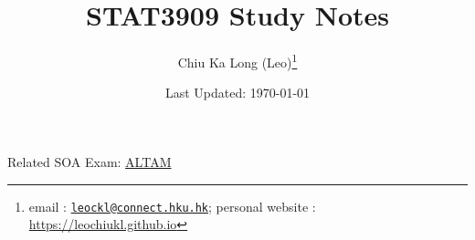 \documentclass{article}
\begin{document}
\title{STAT3909 Study Notes}
\author{Chiu Ka Long (Leo)\thanks{
email :
\href{mailto:leockl@connect.hku.hk}{\texttt{leockl@connect.hku.hk}};
personal website :
\url{https://leochiukl.github.io}
}}
\date{Last Updated: \today}
\maketitle
\doclicenseThis
\begin{note}
Related SOA Exam:
\href{https://www.soa.org/education/exam-req/edu-exam-altam/}{ALTAM}
\end{note}
\tableofcontents





\printbibliography

\end{document}
